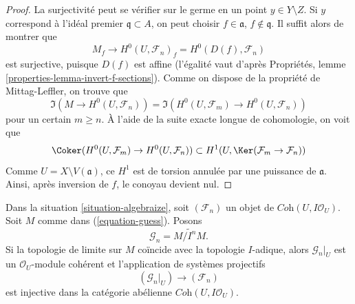 \begin{proof}
La surjectivité peut se vérifier sur le germe en un point $y \in Y \setminus Z$.
Si $y$ correspond à l'idéal premier $\mathfrak q \subset A$, on peut
choisir $f \in \mathfrak a$, $f \not \in \mathfrak q$. Il suffit alors
de montrer que
$$
M_f \longrightarrow H^0(U, \mathcal{F}_n)_f = H^0(D(f), \mathcal{F}_n)
$$
est surjective, puisque $D(f)$ est affine (l'égalité vaut d'après Propriétés,
lemme \ref{properties-lemma-invert-f-sections}). Comme on dispose de la
propriété de Mittag-Leffler, on trouve que
$$
\Im(M \to H^0(U, \mathcal{F}_n)) =
\Im(H^0(U, \mathcal{F}_m) \to H^0(U, \mathcal{F}_n))
$$
pour un certain $m \geq n$. À l'aide de la suite exacte longue de cohomologie, on voit
que
$$
\Coker(H^0(U, \mathcal{F}_m) \to H^0(U, \mathcal{F}_n))
\subset
H^1(U, \Ker(\mathcal{F}_m \to \mathcal{F}_n))
$$
Comme $U = X \setminus V(\mathfrak a)$, ce $H^1$ est de torsion annulée par une puissance de
$\mathfrak a$. Ainsi, après inversion de $f$, le conoyau devient nul.
\end{proof}

\begin{lemma}
\label{lemma-when-topology}
Dans la situation \ref{situation-algebraize}, soit $(\mathcal{F}_n)$ un objet
de $\textit{Coh}(U, I\mathcal{O}_U)$. Soit $M$ comme dans (\ref{equation-guess}).
Posons
$$
\mathcal{G}_n = \widetilde{M/I^nM}.
$$
Si la topologie de limite sur $M$ coïncide avec la topologie $I$-adique, alors
$\mathcal{G}_n|_U$ est un
$\mathcal{O}_U$-module cohérent et l'application de systèmes projectifs
$$
(\mathcal{G}_n|_U) \longrightarrow (\mathcal{F}_n)
$$
est injective dans la catégorie abélienne $\textit{Coh}(U, I\mathcal{O}_U)$.
\end{lemma}

